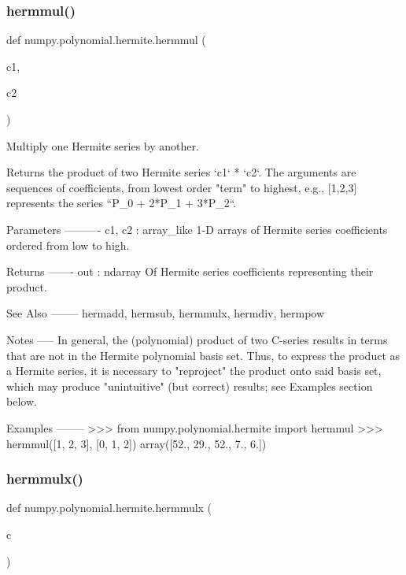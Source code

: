 \subsubsection{\texorpdfstring{hermmul()}{hermmul()}}
{\footnotesize\ttfamily def numpy.\+polynomial.\+hermite.\+hermmul (\begin{DoxyParamCaption}\item[{}]{c1,  }\item[{}]{c2 }\end{DoxyParamCaption})}

\begin{DoxyVerb}Multiply one Hermite series by another.

Returns the product of two Hermite series `c1` * `c2`.  The arguments
are sequences of coefficients, from lowest order "term" to highest,
e.g., [1,2,3] represents the series ``P_0 + 2*P_1 + 3*P_2``.

Parameters
----------
c1, c2 : array_like
    1-D arrays of Hermite series coefficients ordered from low to
    high.

Returns
-------
out : ndarray
    Of Hermite series coefficients representing their product.

See Also
--------
hermadd, hermsub, hermmulx, hermdiv, hermpow

Notes
-----
In general, the (polynomial) product of two C-series results in terms
that are not in the Hermite polynomial basis set.  Thus, to express
the product as a Hermite series, it is necessary to "reproject" the
product onto said basis set, which may produce "unintuitive" (but
correct) results; see Examples section below.

Examples
--------
>>> from numpy.polynomial.hermite import hermmul
>>> hermmul([1, 2, 3], [0, 1, 2])
array([52.,  29.,  52.,   7.,   6.])\end{DoxyVerb}
 \mbox{\label{namespacenumpy_1_1polynomial_1_1hermite_a1d7981c5a02763915f5d5ae7c3d90f54}} 
\subsubsection{\texorpdfstring{hermmulx()}{hermmulx()}}
{\footnotesize\ttfamily def numpy.\+polynomial.\+hermite.\+hermmulx (\begin{DoxyParamCaption}\item[{}]{c }\end{DoxyParamCaption})}

